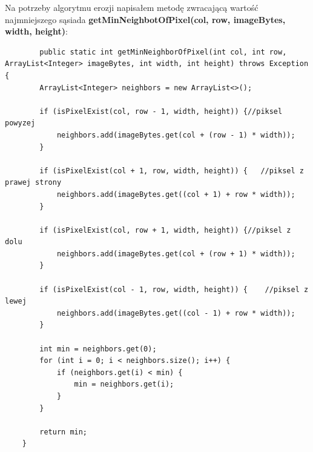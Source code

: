 \documentclass{article}
\begin{document}
	Na potrzeby algorytmu erozji napisałem metodę zwracającą wartość najmniejszego sąsiada \textbf{getMinNeighbotOfPixel(col, row, imageBytes, width, height)}:
	\begin{verbatim}
	    public static int getMinNeighborOfPixel(int col, int row, ArrayList<Integer> imageBytes, int width, int height) throws Exception {
        ArrayList<Integer> neighbors = new ArrayList<>();

        if (isPixelExist(col, row - 1, width, height)) {//piksel powyzej
            neighbors.add(imageBytes.get(col + (row - 1) * width));
        }

        if (isPixelExist(col + 1, row, width, height)) {   //piksel z prawej strony
            neighbors.add(imageBytes.get((col + 1) + row * width));
        }

        if (isPixelExist(col, row + 1, width, height)) {//piksel z dolu
            neighbors.add(imageBytes.get(col + (row + 1) * width));
        }

        if (isPixelExist(col - 1, row, width, height)) {    //piksel z lewej
            neighbors.add(imageBytes.get((col - 1) + row * width));
        }

        int min = neighbors.get(0);
        for (int i = 0; i < neighbors.size(); i++) {
            if (neighbors.get(i) < min) {
                min = neighbors.get(i);
            }
        }

        return min;
    }
	\end{verbatim}
	
\end{document}
